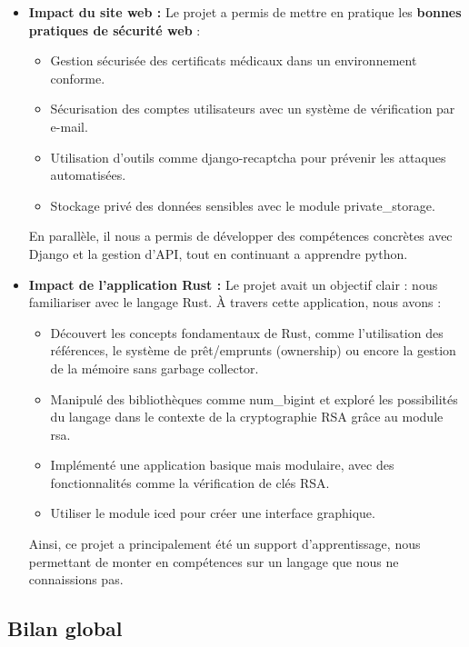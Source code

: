 \documentclass[12pt]{article} %
\begin{document}
\begin{itemize}
    \item \textbf{Impact du site web :}  
    Le projet a permis de mettre en pratique les \textbf{bonnes pratiques de sécurité web} :
    \begin{itemize}
        \item Gestion sécurisée des certificats médicaux dans un environnement conforme.
        \item Sécurisation des comptes utilisateurs avec un système de vérification par e-mail.
        \item Utilisation d'outils comme django-recaptcha pour prévenir les attaques automatisées.
        \item Stockage privé des données sensibles avec le module private\_storage.
    \end{itemize}
    En parallèle, il nous a permis de développer des compétences concrètes avec Django et la gestion d'API, tout en continuant a apprendre python.

    \item \textbf{Impact de l'application Rust :}  
    Le projet avait un objectif clair : nous familiariser avec le langage Rust. À travers cette application, nous avons :
    \begin{itemize}
        \item Découvert les concepts fondamentaux de Rust, comme l'utilisation des références, le système de prêt/emprunts (ownership) ou encore la gestion de la mémoire sans garbage collector.
        \item Manipulé des bibliothèques comme num\_bigint et exploré les possibilités du langage dans le contexte de la cryptographie RSA grâce au module rsa.
        \item Implémenté une application basique mais modulaire, avec des fonctionnalités comme la vérification de clés RSA.
        \item Utiliser le module iced pour créer une interface graphique.
    \end{itemize}
    Ainsi, ce projet a principalement été un support d'apprentissage, nous permettant de monter en compétences sur un langage que nous ne connaissions pas.
\end{itemize}

\subsection{Bilan global}
\end{document}
